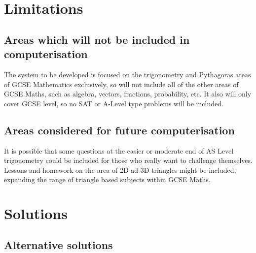\section{Limitations}

\subsection{Areas which will not be included in computerisation}

The system to be developed is focused on the trigonometry and Pythagoras areas of GCSE Mathematics exclusively, so will not include all of the other areas of GCSE Maths, such as algebra, vectors, fractions, probability, etc. It also will only cover GCSE level, so no SAT or A-Level type problems will be included.

\subsection{Areas considered for future computerisation}

It is possible that some questions at the easier or moderate end of AS Level trigonometry could be included for those who really want to challenge themselves. Lessons and homework on the area of 2D ad 3D triangles might be included, expanding the range of triangle based subjects within GCSE Maths.

\section{Solutions}

\subsection{Alternative solutions}

